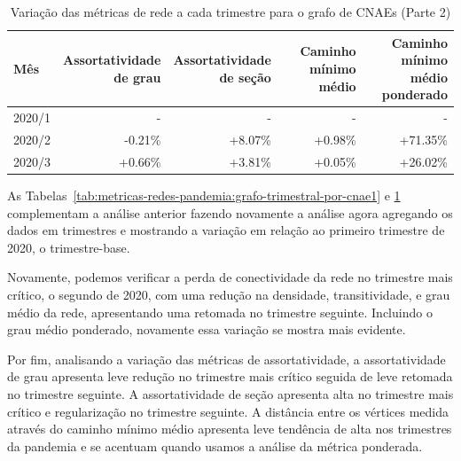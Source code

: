 \begin{table}[htb]
\centering
\caption{Variação das métricas de rede a cada trimestre para o grafo de CNAEs (Parte 2)}
\label{tab:metricas-redes-pandemia:grafo-trimestral-por-cnae2}
\begin{tabular}{l|rrrr}
\toprule
Mês & \shortstack{Assortatividade\\de grau} & \shortstack{Assortatividade\\de seção} & \shortstack{Caminho mínimo\\médio} & \shortstack{Caminho mínimo\\médio ponderado} \\
\midrule
2020/1 & - & - & - & - \\
2020/2 & -0.21\% & +8.07\% & +0.98\% & +71.35\% \\
2020/3 & +0.66\% & +3.81\% & +0.05\% & +26.02\% \\
\bottomrule
\end{tabular}
\fdadospesquisa
\end{table}

As Tabelas~\ref{tab:metricas-redes-pandemia:grafo-trimestral-por-cnae1} e \ref{tab:metricas-redes-pandemia:grafo-trimestral-por-cnae2} complementam a análise anterior fazendo novamente a análise agora agregando os dados em trimestres e mostrando a variação em relação ao primeiro trimestre de 2020, o trimestre-base.

Novamente, podemos verificar a perda de conectividade da rede no trimestre mais crítico, o segundo de 2020, com uma redução na densidade, transitividade, e grau médio da rede, apresentando uma retomada no trimestre seguinte. Incluindo o grau médio ponderado, novamente essa variação se mostra mais evidente.

Por fim, analisando a variação das métricas de assortatividade, a assortatividade de grau apresenta leve redução no trimestre mais crítico seguida de leve retomada no trimestre seguinte. A assortatividade de seção apresenta alta no trimestre mais crítico e regularização no trimestre seguinte. A distância entre os vértices medida através do caminho mínimo médio apresenta leve tendência de alta nos trimestres da pandemia e se acentuam quando usamos a análise da métrica ponderada.

